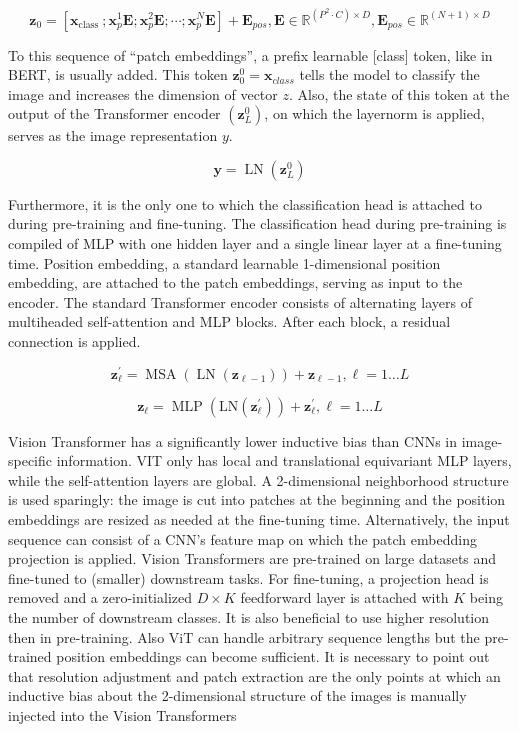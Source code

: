 \documentclass[
]{krantz}
\begin{document}
\[
\mathbf{z}_{0} =\left[\mathbf{x}_{\text {class }} ; \mathbf{x}_{p}^{1} \mathbf{E} ; \mathbf{x}_{p}^{2} \mathbf{E} ; \cdots ; \mathbf{x}_{p}^{N} \mathbf{E}\right]+\mathbf{E}_{p o s}, \mathbf{E} \in \mathbb{R}^{\left(P^{2} \cdot C\right) \times D}, \mathbf{E}_{p o s} \in \mathbb{R}^{(N+1) \times D}
\]

To this sequence of ``patch embeddings'', a prefix learnable {[}class{]} token, like in BERT, is usually added. This token \(\mathbf{z}_{0}^{0} = \mathbf{x}_{class}\) tells the model to classify the image and increases the dimension of vector \(z\). Also, the state of this token at the output of the Transformer encoder \(\left(\mathbf{z}_{L}^{0}\right)\), on which the layernorm is applied, serves as the image representation \(y\).

\[
\mathbf{y} =\operatorname{LN}\left(\mathbf{z}_{L}^{0}\right)
\]

Furthermore, it is the only one to which the classification head is attached to during pre-training and fine-tuning. The classification head during pre-training is compiled of MLP with one hidden layer and a single linear layer at a fine-tuning time. Position embedding, a standard learnable 1-dimensional position embedding, are attached to the patch embeddings, serving as input to the encoder. The standard Transformer encoder consists of alternating layers of multiheaded self-attention and MLP blocks. After each block, a residual connection is applied.

\[
\mathbf{z}_{\ell}^{\prime} =\operatorname{MSA}\left(\operatorname{LN}\left(\mathbf{z}_{\ell-1}\right)\right)+\mathbf{z}_{\ell-1},  \ell=1 \ldots L
\]

\[
\mathbf{z}_{\ell} =\operatorname{MLP}\left(\mathrm{LN}\left(\mathbf{z}_{\ell}^{\prime}\right)\right)+\mathbf{z}_{\ell}^{\prime}, \ell=1 \ldots L
\]

Vision Transformer has a significantly lower inductive bias than CNNs in image-specific information. VIT only has local and translational equivariant MLP layers, while the self-attention layers are global. A 2-dimensional neighborhood structure is used sparingly: the image is cut into patches at the beginning and the position embeddings are resized as needed at the fine-tuning time. Alternatively, the input sequence can consist of a CNN's feature map on which the patch embedding projection is applied.
Vision Transformers are pre-trained on large datasets and fine-tuned to (smaller) downstream tasks. For fine-tuning, a projection head is removed and a zero-initialized \(D \times K\) feedforward layer is attached with \(K\) being the number of downstream classes. It is also beneficial to use higher resolution then in pre-training. Also ViT can handle arbitrary sequence lengths but the pre-trained position embeddings can become sufficient. It is necessary to point out that resolution adjustment and patch extraction are the only points at which an inductive bias about the 2-dimensional structure of the images is manually injected into the Vision Transformers
\end{document}
